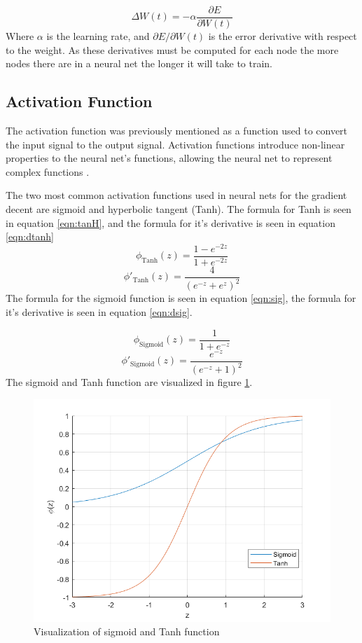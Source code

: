 \documentclass[12pt]{article}
\begin{document}
	\begin{equation}
	\Delta W(t) = - \alpha \frac{\partial E}{\partial W(t)}
	\label{eqn:gdes}
	\end{equation}
	Where $\alpha$ is the learning rate, and  $\partial E/\partial W(t)$ is the error derivative with respect to the weight. As these derivatives must be computed for each node the more nodes there are in a neural net the longer it will take to train. 
	\subsection{Activation Function}
	The activation function was previously mentioned as a function used to convert the input signal to the output signal. Activation functions introduce non-linear properties to the neural net's functions, allowing the neural net to represent complex functions \cite{nnBlog}. \par 
	The two most common activation functions used in neural nets for the gradient decent are sigmoid and hyperbolic tangent (Tanh). 
	The formula for Tanh is seen in equation \ref{eqn:tanH}, and the formula for it's derivative  is seen in equation \ref{eqn:dtanh} 
	\begin{equation}
	\phi_{\text{Tanh}}(z)=\frac{1-e^{-2z}}{1+e^{-2z}}
	\label{eqn:tanH}
	\end{equation}
	\begin{equation}
	\phi'_{\text{Tanh}}(z)=\frac{4}{\left(e^{-z}+e^{z}\right)^2}
	\label{eqn:dtanh}
	\end{equation}
	The formula for the sigmoid function is seen in equation \ref{eqn:sig}, the formula for it's derivative is seen in equation \ref{eqn:dsig}.
	
	\begin{equation}
	\phi_{\text{Sigmoid}}(z)=\frac{1}{1+e^{-z}}
	\label{eqn:sig}
	\end{equation}
	\begin{equation}
	\phi'_{\text{Sigmoid}}(z)=\frac{e^{-z}}{\left(e^{-z}+1\right)^2}
	\label{eqn:dsig}
	\end{equation}
	The sigmoid and Tanh function are visualized in figure \ref{fig:sigvstanh}.
	
	\begin{figure}
		\centering
		\includegraphics[width=0.4\linewidth]{sigVsTanh}
		\caption{Visualization of sigmoid and Tanh function}
		\label{fig:sigvstanh}
	\end{figure}
\end{document}
